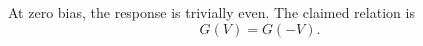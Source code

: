 \documentclass{article}
\begin{document}
At zero bias, the response is trivially even.  The claimed relation is
\begin{equation}
G(V) = G(-V) .
\label{eq:zero-bias-even}
\end{equation}
\end{document}
